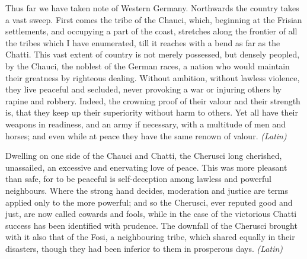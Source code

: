 
Thus far we have taken note of Western Germany. Northwards the country takes a vast sweep. First comes the tribe of the Chauci, which, beginning at the Frisian settlements, and occupying a part of the coast, stretches along the frontier of all the tribes which I have enumerated, till it reaches with a bend as far as the Chatti. This vast extent of country is not merely possessed, but densely peopled, by the Chauci, the noblest of the German races, a nation who would maintain their greatness by righteous dealing. Without ambition, without lawless violence, they live peaceful and secluded, never provoking a war or injuring others by rapine and robbery. Indeed, the crowning proof of their valour and their strength is, that they keep up their superiority without harm to others. Yet all have their weapons in readiness, and an army if necessary, with a multitude of men and horses; and even while at peace they have the same renown of valour. \emph{(Latin)}


Dwelling on one side of the Chauci and Chatti, the Cherusci long cherished, unassailed, an excessive and enervating love of peace. This was more pleasant than safe, for to be peaceful is self-deception among lawless and powerful neighbours. Where the strong hand decides, moderation and justice are terms applied only to the more powerful; and so the Cherusci, ever reputed good and just, are now called cowards and fools, while in the case of the victorious Chatti success has been identified with prudence. The downfall of the Cherusci brought with it also that of the Fosi, a neighbouring tribe, which shared equally in their disasters, though they had been inferior to them in prosperous days. \emph{(Latin)}


